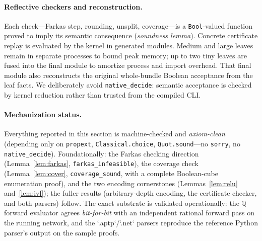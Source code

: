 \documentclass[runningheads]{llncs}
\newcommand{\Q}{\mathbb{Q}}
\newcommand{\code}[1]{\texttt{#1}}
\begin{document}
\paragraph{Reflective checkers and reconstruction.} Each check---Farkas step,
rounding, unsplit, coverage---is a \code{Bool}-valued function proved to imply its
semantic consequence (\emph{soundness lemma}). Concrete certificate replay is
evaluated by the kernel in generated modules. Medium and large leaves remain in
separate processes to bound peak memory; up to two tiny leaves are fused into the
final module to amortize process and import overhead. That final module also
reconstructs the original whole-bundle Boolean acceptance from the leaf facts.
We deliberately avoid \code{native\_decide}: semantic acceptance is checked by
kernel reduction rather than trusted from the compiled CLI.

\paragraph{Mechanization status.} Everything reported in this section is
machine-checked and \emph{axiom-clean} (depending only on \code{propext},
\code{Classical.choice}, \code{Quot.sound}---no \code{sorry}, no \code{native\_decide}).
Foundationally: the Farkas checking direction (Lemma~\ref{lem:farkas},
\code{farkas\_infeasible}), the coverage check (Lemma~\ref{lem:cover},
\code{coverage\_sound}, with a complete Boolean-cube enumeration proof), and the two
encoding cornerstones (Lemmas~\ref{lem:relu} and~\ref{lem:ivl}); the fuller results
(arbitrary-depth encoding, the certificate checker, and both parsers) follow. The
exact substrate is validated operationally: the $\Q$
forward evaluator agrees \emph{bit-for-bit} with an independent rational forward pass
on the running network, and the `.aptp`/`.net` parsers reproduce the reference
Python parser's output on the sample proofs.
\end{document}
